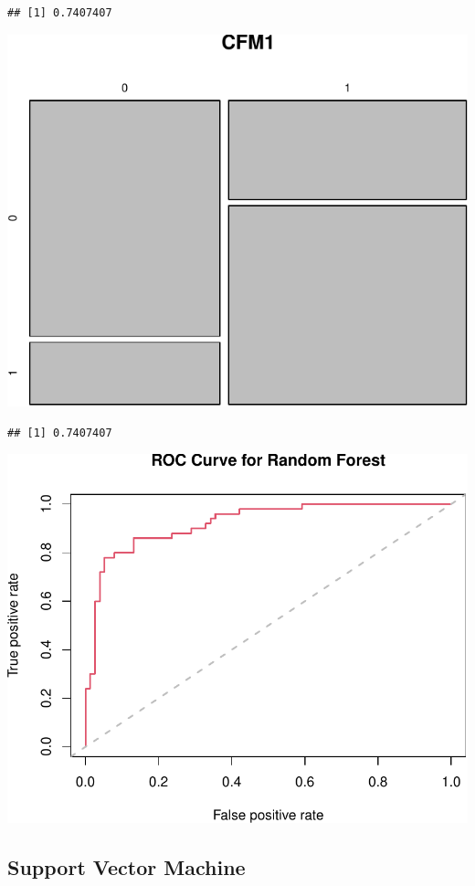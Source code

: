\documentclass[11pt,preprint, authoryear]{elsarticle}
\numberwithin{equation}{section}
\numberwithin{figure}{section}
\numberwithin{table}{section}
\begin{document}
\begin{verbatim}
## [1] 0.7407407
\end{verbatim}

\includegraphics{ML_project_files/figure-latex/unnamed-chunk-15-1.pdf}

\begin{verbatim}
## [1] 0.7407407
\end{verbatim}

\includegraphics{ML_project_files/figure-latex/unnamed-chunk-17-1.pdf}

\hypertarget{support-vector-machine}{%
\subsection{Support Vector Machine}\label{support-vector-machine}}
\end{document}
